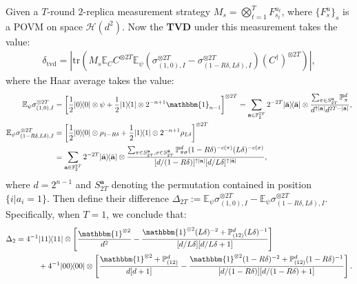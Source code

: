 \documentclass[aps,%
twocolumn,%
floatfix,%
pra,%
amsfonts,%
groupedaddress,%
superscriptaddress]{revtex4-2}%
\newcommand{\bra}[1]{\langle #1\rvert}
\newcommand{\ket}[1]{\lvert #1\rangle}
\newcommand{\1}{\mathbbm{1}}
\begin{document}
Given a $T$-round $2$-replica measurement strategy $M_s = \bigotimes_{t = 1}^{T} F_{s_t}^{u_t}$, where $\{F_{s}^{u}\}_{s}$ is a POVM on space $\mathcal{H}(d^2)$.
Now the \textbf{TVD} under this measurement takes the value:
\begin{align}
    \delta_{\mathrm{tvd}} = \left|\mathrm{tr}\left(M_s  \mathbb{E}_{C}C^{\otimes 2T}\mathbb{E}_{\psi}\left(\sigma_{(1,0),I}^{\otimes 2T} - \sigma_{(1 - R\delta,L\delta),I}^{\otimes 2T}\right)(C^\dagger)^{\otimes 2T}\right)\right|,
\end{align}
where the Haar average takes the value:
\begin{align}
    \mathbb{E}_{\psi}\sigma_{(1,0),I}^{\otimes 2T} &= \left[\frac{1}{2}\ket{0}\!\bra{0} \otimes \psi  + \frac{1}{2}\ket{1}\!\bra{1} \otimes 2^{-n+1}\1_{n-1}\right]^{\otimes 2T} = \sum_{\mathbf{a} \in \mathbb{F}_2^{2T}} {2^{-2T}\ket{\bar{\mathbf{a}}}\!\bra{\bar{\mathbf{a}}} }\otimes\frac{\sum_{\pi \in S_{2T}^{\mathbf{a}}} \mathbb{P}_{\pi}^{d}}{d^{\uparrow |\mathbf{a}|} d^{2T - |\mathbf{a}|}},\\
    \mathbb{E}_{\psi}\sigma_{(1 - R\delta,L\delta),I}^{\otimes 2T} &= \left[\frac{1}{2}\ket{0}\!\bra{0} \otimes \rho_{1 - R\delta} + \frac{1}{2}\ket{1}\!\bra{1} \otimes 2^{-n+1}\rho_{L\delta}\right]^{\otimes 2T} \\
    &= \sum_{\mathbf{a} \in \mathbb{F}_2^{2T}} {2^{-2T}\ket{\bar{\mathbf{a}}}\!\bra{\bar{\mathbf{a}}}} \otimes \frac{\sum_{\pi \in S_{2T}^{\mathbf{a}}, \sigma \in S_{2T}^{\bar{\mathbf{a}}}} \mathbb{P}_{\pi \sigma}^{d} (1 - R \delta)^{-c(\pi)} (L\delta)^{-c(\sigma)}}{[d/(1 - R\delta)]^{\uparrow |\mathbf{a}|} [d/L\delta]^{\uparrow |\bar{\mathbf{a}}|}},
\end{align}
where $d = 2^{n-1}$ and $S_{2T}^{\mathbf{a}}$ denoting the permutation contained in position $\{i|a_i = 1\}$.
Then define their difference $\Delta_{2T} :=\mathbb{E}_{\psi}\sigma_{(1,0),I}^{\otimes 2T}  -  \mathbb{E}_{\psi}\sigma_{(1 - R\delta,L\delta),I}^{\otimes 2T} $. Specifically, when $T = 1$, we conclude that:
\begin{align}
  \Delta_{2} =  4^{-1}  &{\ket{11}\!\bra{11}} 
     \otimes \left[\frac{\1^{\otimes 2}}{ d^{2}} - \frac{\1^{\otimes 2} (L\delta)^{-2} + \mathbb{P}^{d}_{(12)}(L\delta)^{-1}}{[d/L\delta][d/L\delta + 1] }\right] \\
     &+ 4^{-1}  {\ket{00}\!\bra{00}} 
     \otimes \left[\frac{\1^{\otimes 2}  + \mathbb{P}^{d}_{(12)}}{d[d + 1] } - \frac{\1^{\otimes 2} (1 -R\delta)^{-2} + \mathbb{P}^{d}_{(12)}(1 -R\delta)^{-1}}{[d/(1 -R\delta)][d/(1 -R\delta) + 1] }\right].
\end{align}
\end{document}
